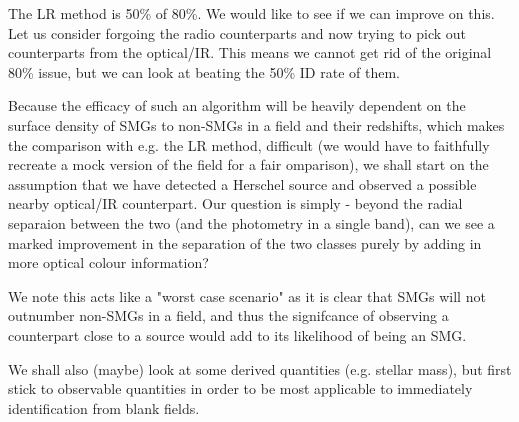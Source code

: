 {\color{red}The LR method is 50\% of 80\%. We would like to see if we can improve on this. Let us consider forgoing the radio counterparts and now trying to pick out counterparts from the optical/IR. This means we cannot get rid of the original 80\% issue, but we can look at beating the 50\% ID rate of them.}

{\color{red}Because the efficacy of such an algorithm will be heavily dependent on the surface density of SMGs to non-SMGs in a field and their redshifts, which makes the comparison with e.g. the LR method, difficult (we would have to faithfully recreate a mock version of the field for a fair omparison), we shall start on the assumption that we have detected a Herschel source and observed a possible nearby optical/IR counterpart. Our question is simply - beyond the radial separaion between the two (and the photometry in a single band), can we see a marked improvement in the separation of the two classes purely by adding in more optical colour information?}

{\color{red}We note this acts like a "worst case scenario" as it is clear that SMGs will not outnumber non-SMGs in a field, and thus the signifcance of observing a counterpart close to a source would add to its likelihood of being an SMG.}

{\color{red}We shall also (maybe) look at some derived quantities (e.g. stellar mass), but first stick to observable quantities in order to be most applicable to immediately identification from blank fields.}

